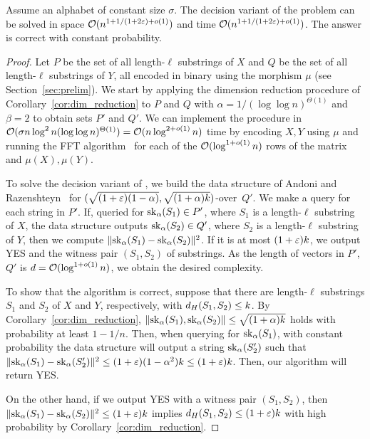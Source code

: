 \begin{lemma}\label{lm:opt_NN}
Assume an alphabet of constant size $\sigma$. The decision variant of the \kApproxLCS problem can be solved in space $\mathcal{O}(n^{1+ 1/(1+2\varepsilon) + o(1)})$ and time $\mathcal{O}(n^{1+ 1/(1+2\varepsilon) + o(1)})$. The answer is correct with constant probability. 
\end{lemma}
\begin{proof}
Let $P$ be the set of all length-$\ell$ substrings of $X$ and $Q$ be the set of all length-$\ell$ substrings of $Y$,
all encoded in binary using the morphism $\mu$ (see Section~\ref{sec:prelim}). We start by applying the dimension reduction procedure of Corollary~\ref{cor:dim_reduction} to $P$ and $Q$ with $\alpha = 1/(\log\log n)^{\Theta(1)}$ and $\beta = 2$ to obtain sets $P'$ and $Q'$. We can implement the procedure in $\mathcal{O}(\sigma n \log^2 n (\log\log n)^{\Theta(1)}) = \mathcal{O}(n \log^{2+o(1)} n)$ time by encoding $X, Y$ using $\mu$ and running the FFT algorithm~\cite{FischerPaterson} for each of the $\mathcal{O}(\log^{1+o(1)} n)$ rows of the matrix and $\mu(X), \mu(Y)$. 

To solve the decision variant of \kApproxLCS, we build the data structure of Andoni and Razenshteyn~\cite{DBLP:conf/stoc/AndoniR15} for $(\sqrt{(1+\varepsilon)(1-\alpha)}, \sqrt{(1+\alpha)k})$-\NN over~$Q'$. We make a query for each string in $P'$. If, queried for $\mathrm{sk}_{\alpha}(S_1)\in P'$, where $S_1$ is a length-$\ell$ substring of $X$, the data structure outputs $\mathrm{sk}_{\alpha}(S_2)\in Q'$, where $S_2$ is a length-$\ell$ substring of $Y$, then we compute $\lVert\mathrm{sk}_{\alpha}(S_1)- \mathrm{sk}_{\alpha}(S_2)\rVert^2$. If it is at most $(1+\varepsilon)k$, we output YES and the witness pair $(S_1,S_2)$ of substrings. As the length of vectors in $P'$, $Q'$ is $d = \mathcal{O}(\log^{1+o(1)} n)$, we obtain the desired complexity. 

To show that the algorithm is correct, suppose that there are length-$\ell$ substrings $S_1$ and $S_2$ of $X$ and $Y$, respectively, with $d_H(S_1, S_2) \le k$. By Corollary~\ref{cor:dim_reduction}, $\lVert\mathrm{sk}_\alpha(S_1),\mathrm{sk}_\alpha(S_2)\rVert\le \sqrt{(1+\alpha)k}$ holds with probability at least $1-1/n$. Then, when querying for $\mathrm{sk}_\alpha(S_1)$, with constant probability the data structure will output a string $\mathrm{sk}_\alpha(S'_2)$ such that $\lVert\mathrm{sk}_\alpha(S_1) - \mathrm{sk}_\alpha(S'_2)\rVert^2 \le (1+\varepsilon)(1-\alpha^2) k \le (1+\varepsilon) k$. Then, our algorithm will return YES. 

On the other hand, if we output YES with a witness pair $(S_1,S_2)$, then $\lVert\mathrm{sk}_\alpha(S_1) - \mathrm{sk}_\alpha(S_2)\rVert^2\le (1+\varepsilon)k$ implies $d_H(S_1,S_2)\le (1+\varepsilon)k$ with high probability by Corollary~\ref{cor:dim_reduction}.
\end{proof}

